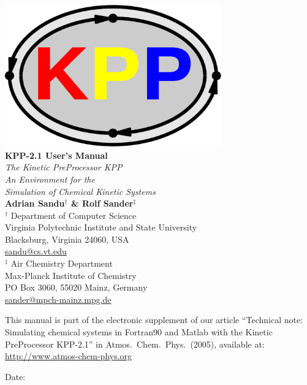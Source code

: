 \documentclass[twoside]{article}
\begin{document}
\thispagestyle{empty}
\vspace*{-2cm}
\begin{center}
  {\includegraphics[width=0.7\textwidth]{Figures/kpp-logo}}\\[9mm]
  {\Huge\bf KPP-2.1 User's Manual}\\[9mm]
  {\huge\em The Kinetic PreProcessor KPP}\\[3mm]
  {\huge\em An Environment for the}\\[3mm]
  {\huge\em Simulation of Chemical Kinetic Systems}\\[9mm]
  {\huge\bf Adrian Sandu$^\dagger$ \& Rolf Sander$^\ddagger$}\\[9mm]
  \Large
  $^\dagger$ Department of Computer Science\\
  Virginia Polytechnic Institute and State University\\
  Blacksburg, Virginia 24060, USA\\
  \url{sandu@cs.vt.edu}\\[5mm]
  $^\ddagger$ Air Chemistry Department\\
  Max-Planck Institute of Chemistry\\
  PO Box 3060, 55020 Mainz, Germany\\
  \url{sander@mpch-mainz.mpg.de}

\end{center}

\vfill

{\large This manual is part of the electronic supplement of our article
  ``Technical note: Simulating chemical systems in Fortran90 and Matlab
  with the Kinetic PreProcessor KPP-2.1'' in Atmos.\ Chem.\ Phys.\ 
  (2005), available at: \url{http://www.atmos-chem-phys.org}}

\begin{center}
  Date: \thedate
\end{center}

\newpage\twocolumn
\end{document}
